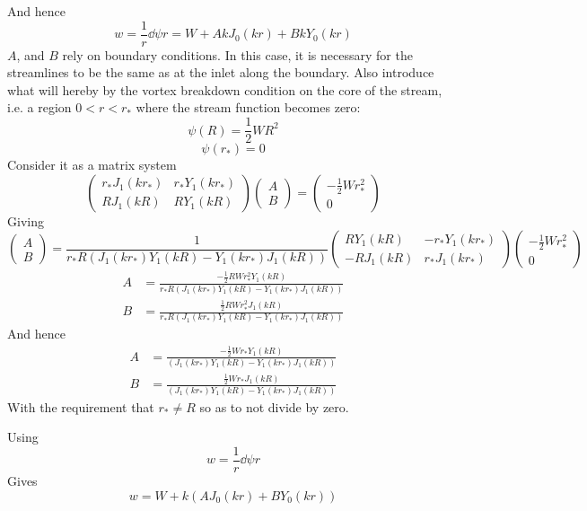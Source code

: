 \documentclass{X:/Documents/Coding/Latex/myreport}
\begin{document}
And hence
\[w = \frac1r \dd\psi r = W + Ak J_0(kr) + Bk Y_0(kr)\]
$A$, and $B$ rely on boundary conditions. In this case, it is necessary for the streamlines to be the same as at the inlet along the boundary. Also introduce what will hereby by the vortex breakdown condition on the core of the stream, i.e. a region $0<r<r_*$ where the stream function becomes zero:
\[\psi(R) = \frac12 WR^2\]
\[\psi(r_*) = 0 \]
Consider it as a matrix system
\[
\begin{pmatrix}
r_*J_1(kr_*) & r_*Y_1(kr_*)\\
RJ_1(kR) & RY_1(kR)
\end{pmatrix}\begin{pmatrix}
A\\B
\end{pmatrix} = 
\begin{pmatrix}
-\frac12 Wr_*^2\\0
\end{pmatrix}
\]
Giving
\[
\begin{pmatrix}
A\\B
\end{pmatrix} = 
\frac{1}{r_* R\left(J_1(kr_*)Y_1(kR) - Y_1(kr_*)J_1(kR)\right)}
\begin{pmatrix}
RY_1(kR) & -r_*Y_1(kr_*)\\
-RJ_1(kR) & r_*J_1(kr_*)
\end{pmatrix}
\begin{pmatrix}
-\frac12 Wr_*^2\\0
\end{pmatrix}
\]
\begin{align*}
    A&= \frac{-\frac12 RW r_*^2 Y_1(kR)}{r_*R\left(J_1(kr_*)Y_1(kR) - Y_1(kr_*)J_1(kR)\right)}\\
B&=\frac{\frac12 RW r_*^2 J_1(kR)}{r_*R\left(J_1(kr_*)Y_1(kR) - Y_1(kr_*)J_1(kR)\right)}
\end{align*}
And hence
\begin{align*}
    A&= \frac{-\frac12 W r_*Y_1(kR)}{\left(J_1(kr_*)Y_1(kR) - Y_1(kr_*)J_1(kR)\right)}\\
B&=\frac{\frac12 W r_* J_1(kR)}{\left(J_1(kr_*)Y_1(kR) - Y_1(kr_*)J_1(kR)\right)}
\end{align*}
With the requirement that $r_* \neq R$ so as to not divide by zero.


Using 
\[w = \frac1r \dd\psi r\] 
Gives
\[w = W + k(AJ_0(kr) + BY_0(kr))\]
\end{document}
